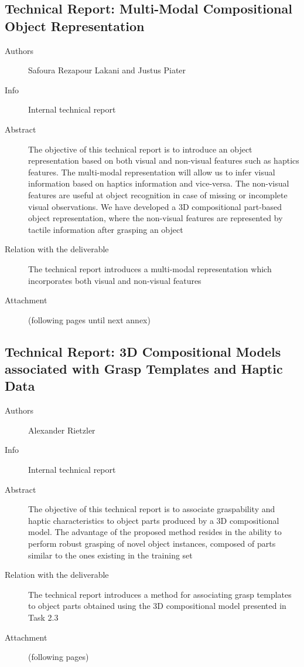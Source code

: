 \documentclass[a4paper,11pt,pdf]{pacmanreport}
\begin{document}
\subsection{Technical Report: Multi-Modal Compositional Object Representation} \label{ann:techReport}
\begin{description}
\item[Authors] Safoura Rezapour Lakani and Justus Piater
\item[Info] Internal technical report
\item[Abstract] The objective of this technical report is to introduce an object representation based on both visual and non-visual features such as haptics features. The multi-modal representation will allow us to infer visual information based on haptics information and vice-versa. The non-visual features are useful at object recognition in case of missing or incomplete visual observations. We have developed a 3D compositional part-based object representation, where the non-visual features are represented by tactile information after grasping an object
\item[Relation with the deliverable] The technical report introduces a multi-modal representation which incorporates both visual and non-visual features
\item[Attachment] (following pages until next annex) 
\end{description}


\subsection{Technical Report: 3D Compositional Models associated with Grasp Templates and Haptic Data} \label{ann:techReportAlex}
\begin{description}
\item[Authors] Alexander Rietzler
\item[Info] Internal technical report
\item[Abstract] The objective of this technical report is to associate graspability and haptic characteristics to object parts produced by a 3D compositional model. The advantage of the proposed method resides in the ability to perform robust grasping of novel object instances, composed of parts similar to the ones existing in the training set
\item[Relation with the deliverable] The technical report introduces a method for associating grasp templates to object parts obtained using the 3D compositional model presented in Task 2.3
\item[Attachment] (following pages) 
\end{description}

\end{document}
